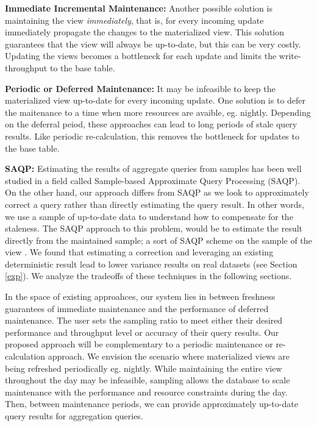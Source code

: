 \vspace{1em}

\noindent\textbf{Immediate Incremental Maintenance: }
Another possible solution is maintaining the view \emph{immediately}, that is, for every incoming update
immediately propagate the changes to the materialized view.
This solution guarantees that the view will always be up-to-date, but this can be very costly.
Updating the views becomes a bottleneck for each update and limits the write-throughput to the base table.

\vspace{1em}

\noindent\textbf{Periodic or Deferred Maintenance: }
It may be infeasible to keep the materialized view up-to-date for every incoming update.
One solution is to defer the maitenance to a time when more resources are avaible, eg. nightly.
Depending on the deferral peiod, these approaches can lead to long periods of stale query results.
Like periodic re-calculation, this removes the bottleneck for updates to the base table.

\vspace{1em}

\noindent\textbf{SAQP: }
Estimating the results of aggregate queries from samples has been
well studied in a field called Sample-based Approximate Query Processing
(SAQP). On the other hand, our approach differs from SAQP as we look to
approximately correct a query rather than directly estimating the query result.
In other words, we use a sample of up-to-date data to understand how to compensate for the
staleness. The SAQP approach to this problem, would be to
estimate the result directly from the maintained sample; a sort of
SAQP scheme on the sample of the view \cite{joshi2008materialized}. We found that estimating
a correction and leveraging an existing deterministic result lead
to lower variance results on real datasets (see Section \ref{exp}). We analyze
the tradeoffs of these techniques in the following sections.

\vspace{1em}

In the space of existing approahces, our system lies in between freshness guarantees of immediate maintenance and the performance of deferred maintenance.
The user sets the sampling ratio to meet either their desired performance and throughput level or accuracy of their query results.
Our proposed approach will be complementary to a periodic maintenance or re-calculation approach.
We envision the scenario where materialized views are being refreshed periodically eg. nightly.
While maintaining the entire view throughout the day may be infeasible, sampling allows the database to scale maintenance with the performance and resource constraints during the day.
Then, between maintenance periods, we can provide approximately up-to-date query results for aggregation queries.

